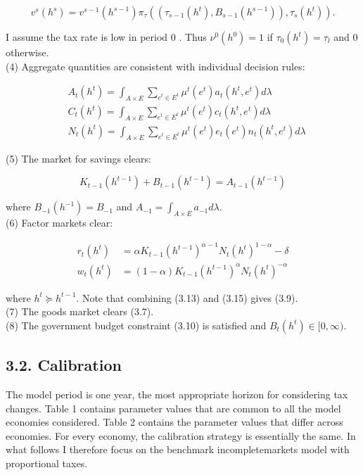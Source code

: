 \documentclass[11pt]{article}
\begin{document}
$$
v^{s}\left(h^{s}\right)=v^{s-1}\left(h^{s-1}\right) \pi_{\tau}\left(\left(\tau_{s-1}\left(h^{t}\right), B_{s-1}\left(h^{s-1}\right)\right), \tau_{s}\left(h^{t}\right)\right) .
$$

I assume the tax rate is low in period 0 . Thus $\nu^{0}\left(h^{0}\right)=1$ if $\tau_{0}\left(h^{t}\right)=\tau_{l}$ and 0 otherwise.\\
(4) Aggregate quantities are consistent with individual decision rules:


\begin{align*}
& A_{t}\left(h^{t}\right)=\int_{A \times E} \sum_{e^{t} \in E^{t}} \mu^{t}\left(e^{t}\right) a_{t}\left(h^{t}, e^{t}\right) d \lambda \\
& C_{t}\left(h^{t}\right)=\int_{A \times E} \sum_{e^{t} \in E^{t}} \mu^{t}\left(e^{t}\right) c_{t}\left(h^{t}, e^{t}\right) d \lambda \\
& N_{t}\left(h^{t}\right)=\int_{A \times E} \sum_{e^{t} \in E^{t}} \mu^{t}\left(e^{t}\right) e_{t}\left(e^{t}\right) n_{t}\left(h^{t}, e^{t}\right) d \lambda \tag{3.13}
\end{align*}


(5) The market for savings clears:

$$
K_{t-1}\left(h^{t-1}\right)+B_{t-1}\left(h^{t-1}\right)=A_{t-1}\left(h^{t-1}\right)
$$

where $B_{-1}\left(h^{-1}\right)=B_{-1}$ and $A_{-1}=\int_{A \times E} a_{-1} d \lambda$.\\
(6) Factor markets clear:


\begin{align*}
r_{t}\left(h^{t}\right) & =\alpha K_{t-1}\left(h^{t-1}\right)^{\alpha-1} N_{t}\left(h^{t}\right)^{1-\alpha}-\delta  \tag{3.14}\\
w_{t}\left(h^{t}\right) & =(1-\alpha) K_{t-1}\left(h^{t-1}\right)^{\alpha} N_{t}\left(h^{t}\right)^{-\alpha} \tag{3.15}
\end{align*}


where $h^{t} \succeq h^{t-1}$. Note that combining (3.13) and (3.15) gives (3.9).\\
(7) The goods market clears (3.7).\\
(8) The government budget constraint (3.10) is satisfied and $B_{t}\left(h^{t}\right) \in[0, \infty)$.

\subsection*{3.2. Calibration}
The model period is one year, the most appropriate horizon for considering tax changes. Table 1 contains parameter values that are common to all the model economies considered. Table 2 contains the parameter values that differ across economies. For every economy, the calibration strategy is essentially the same. In what follows I therefore focus on the benchmark incompletemarkets model with proportional taxes.
\end{document}
